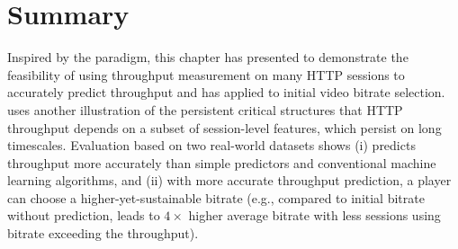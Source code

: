 









\section{Summary}
\label{sec:dda:summary}
Inspired by the \ddn paradigm, this chapter
has presented \name to demonstrate the feasibility of using 
throughput measurement on many HTTP sessions to 
accurately predict throughput and has applied \name to initial video bitrate
selection.
\name uses another illustration of the persistent critical structures that HTTP throughput 
depends on a subset of session-level features, which persist on long timescales.
Evaluation based on two real-world datasets shows (i) \name predicts throughput more accurately than simple predictors and conventional machine learning algorithms, and (ii) with more accurate throughput prediction, a player can choose a higher-yet-sustainable bitrate (e.g., compared to initial bitrate without prediction, \name leads to $4\times$ higher average bitrate with less sessions using bitrate exceeding the throughput).




